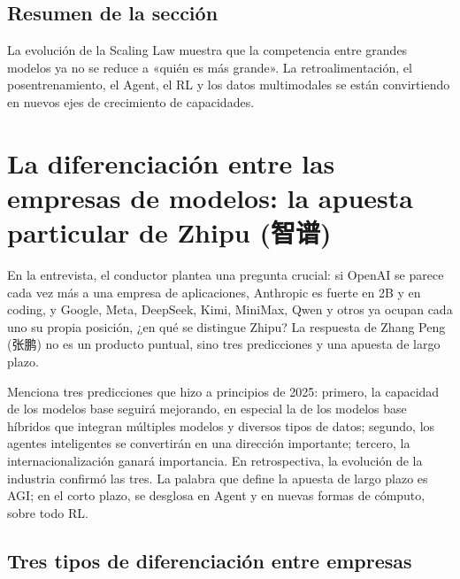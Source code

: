 \documentclass[a4paper]{article}
\begin{document}
\subsection{Resumen de la sección}

La evolución de la Scaling Law muestra que la competencia entre grandes modelos ya no se reduce a «quién es más grande». La retroalimentación, el posentrenamiento, el Agent, el RL y los datos multimodales se están convirtiendo en nuevos ejes de crecimiento de capacidades.
\section{La diferenciación entre las empresas de modelos: la apuesta particular de Zhipu (智谱)}

En la entrevista, el conductor plantea una pregunta crucial: si OpenAI se parece cada vez más a una empresa de aplicaciones, Anthropic es fuerte en 2B y en coding, y Google, Meta, DeepSeek, Kimi, MiniMax, Qwen y otros ya ocupan cada uno su propia posición, ¿en qué se distingue Zhipu? La respuesta de Zhang Peng (张鹏) no es un producto puntual, sino tres predicciones y una apuesta de largo plazo.

Menciona tres predicciones que hizo a principios de 2025: primero, la capacidad de los modelos base seguirá mejorando, en especial la de los modelos base híbridos que integran múltiples modelos y diversos tipos de datos; segundo, los agentes inteligentes se convertirán en una dirección importante; tercero, la internacionalización ganará importancia. En retrospectiva, la evolución de la industria confirmó las tres. La palabra que define la apuesta de largo plazo es AGI; en el corto plazo, se desglosa en Agent y en nuevas formas de cómputo, sobre todo RL.

\subsection{Tres tipos de diferenciación entre empresas}
\end{document}
